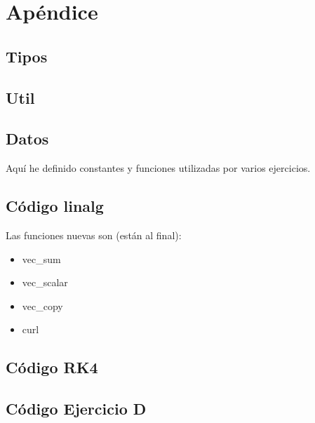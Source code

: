 \section{Apéndice} 

\subsection{Tipos}\label{code:types}


\newpage

\subsection{Util}\label{code:util}


\newpage

\subsection{Datos}\label{code:data}

Aquí he definido constantes y funciones utilizadas por varios ejercicios.


\newpage


\subsection{Código linalg}
\label{code:linalg}

Las funciones nuevas son (están al final): 
\begin{itemize}
	\item vec\_sum
	\item vec\_scalar
	\item vec\_copy
	\item curl
\end{itemize}


\newpage

\subsection{Código RK4}
\label{code:rk4}


\newpage

\subsection{Código Ejercicio D}
\label{code:ex4}

